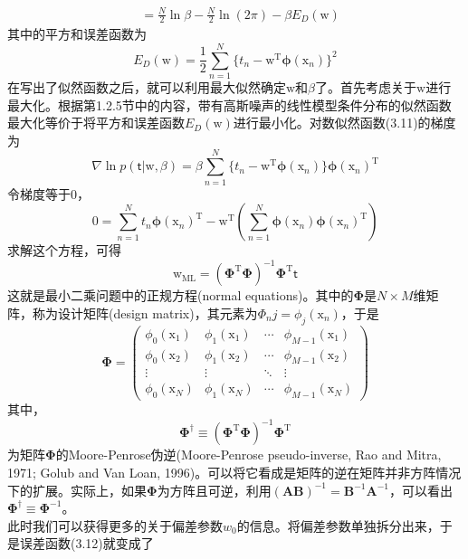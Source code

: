 \documentclass[b5paper]{book}
\numberwithin{equation}{chapter}
\newcommand {\bx} {\boldsymbol{\mathrm{x}}}
\newcommand {\bw} {\boldsymbol{\mathrm{w}}}
\newcommand {\sft} {\boldsymbol{\mathsf{t}}}
\newcommand {\rmT} {\mathrm{T}}
\newcommand {\bfPhi} {\boldsymbol{\Phi}}
\newcommand {\bfphi} {\boldsymbol{\phi}}
\begin{document}
{\begin{equation}
\begin{split}
		&= \frac{N}{2} \ln \beta - \frac{N}{2} \ln (2\pi)-\beta E_D(\bw)
	\end{split}
	\end{equation}
	其中的平方和误差函数为
	\begin{equation}
		E_D(\bw) = \frac{1}{2}\sum_{n=1}^N \{t_n - \bw^{\rmT} \bfphi(\bx_n)\}^2
	\end{equation}
	\indent 在写出了似然函数之后，就可以利用最大似然确定$\bw$和$\beta$了。首先考虑关于$\bw$进行最大化。根据第1.2.5节中的内容，带有高斯噪声的线性模型条件分布的似然函数最大化等价于将平方和误差函数$E_D(\bw)$进行最小化。对数似然函数(3.11)的梯度为
	\begin{equation}
		\nabla \ln p(\sft|\bw,\beta) = \beta \sum_{n=1}^N \{t_n - \bw^{\rmT} \bfphi(\bx_n)\} \bfphi(\bx_n)^{\rmT}
	\end{equation}
	令梯度等于0，
	\begin{equation}
		0 = \sum_{n=1}^N t_n \bfphi(\bx_n)^{\rmT} - \bw^{\rmT} \left(\sum_{n=1}^N\bfphi(\bx_n)\bfphi(\bx_n)^{\rmT}\right)
	\end{equation}
	求解这个方程，可得
	\begin{equation}
		\bw_{\mathrm{ML}}=(\bfPhi^{\rmT}\bfPhi)^{-1}\bfPhi^{\rmT}\sft
	\end{equation}
	这就是最小二乘问题中的正规方程(normal equations)。其中的$\bfPhi$是$N \times M$维矩阵，称为设计矩阵(design matrix)，其元素为$\Phi_nj = \phi_j(\bx_n)$，于是
	\begin{equation}
		\bfPhi = \left(
		\begin{matrix}
			\phi_0(\bx_1) & \phi_1(\bx_1) & \cdots & \phi_{M-1}(\bx_1) \\
			\phi_0(\bx_2) & \phi_1(\bx_2) & \cdots & \phi_{M-1}(\bx_2) \\
			\vdots & \vdots & \ddots & \vdots \\
			\phi_0(\bx_N) & \phi_1(\bx_N) & \cdots & \phi_{M-1}(\bx_N)
		\end{matrix} \right)
	\end{equation}
	其中，
	\begin{equation}
		\bfPhi^\dagger \equiv (\bfPhi^{\rmT} \bfPhi)^{-1} \bfPhi^{\rmT}
	\end{equation}
	为矩阵$\bfPhi$的Moore-Penrose伪逆(Moore-Penrose pseudo-inverse, Rao and Mitra, 1971; Golub and Van Loan, 1996)。可以将它看成是矩阵的逆在矩阵并非方阵情况下的扩展。实际上，如果$\bfPhi$为方阵且可逆，利用$(\mathbf{AB})^{-1}=\mathbf{B}^{-1} \mathbf{A}^{-1}$，可以看出$\bfPhi^{\dagger} \equiv \bfPhi^{-1}$。\\
	\indent 此时我们可以获得更多的关于偏差参数$w_0$的信息。将偏差参数单独拆分出来，于是误差函数(3.12)就变成了
}
\end{document}
